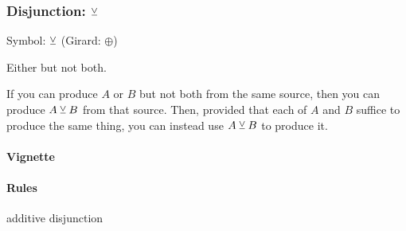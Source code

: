 \documentclass{article}
\begin{document}

\subsubsection[Disjunction: either but not both]{Disjunction: \(\veebar\)}

Symbol: \(\veebar\) (Girard: \(\oplus\))

Either but not both.

If you can produce \(A\) or \(B\) but not both from the same source,
then you can produce \(A\veebar B\) from that source.
Then, provided that each of \(A\) and \(B\) suffice to produce
the same thing, you can instead use \(A\veebar B\) to produce it.


\paragraph{Vignette\\}

\paragraph{Rules} additive disjunction


\end{document}
